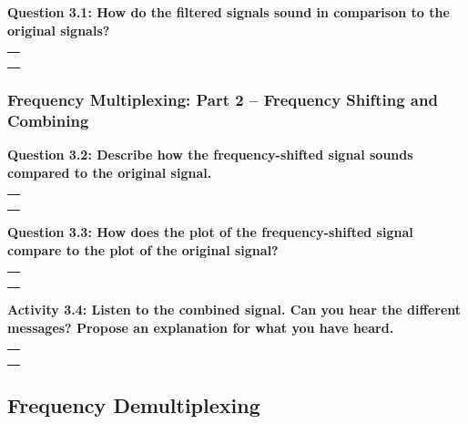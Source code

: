 \documentclass[11pt]{article}
\begin{document}
\textbf{Question 3.1: How do the filtered signals sound in comparison to
the original signals?}

\begin{longtable}[]{@{}l@{}}
\toprule
 \\
\midrule
\endhead
 \\
 \\
 \\
\bottomrule
\end{longtable}

\hypertarget{frequency-multiplexing-part-2-frequency-shifting-and-combining}{%
\subsubsection*{Frequency Multiplexing: Part 2 -- Frequency Shifting and
Combining}\label{frequency-multiplexing-part-2-frequency-shifting-and-combining}}

\textbf{Question 3.2: Describe how the frequency-shifted signal sounds
compared to the original signal.}

\begin{longtable}[]{@{}l@{}}
\toprule
 \\
\midrule
\endhead
 \\
 \\
 \\
\bottomrule
\end{longtable}

\newpage
\textbf{Question 3.3: How does the plot of the frequency-shifted signal
compare to the plot of the original signal?}

\begin{longtable}[]{@{}l@{}}
\toprule
 \\
\midrule
\endhead
 \\
 \\
 \\
\bottomrule
\end{longtable}

\textbf{Activity 3.4: Listen to the combined signal. Can you hear the
different messages? Propose an explanation for what you have heard.}

\begin{longtable}[]{@{}l@{}}
\toprule
 \\
\midrule
\endhead
 \\
 \\
 \\
\bottomrule
\end{longtable}

\hypertarget{frequency-demultiplexing}{%
\subsection*{Frequency Demultiplexing}\label{frequency-demultiplexing}}
\end{document}
